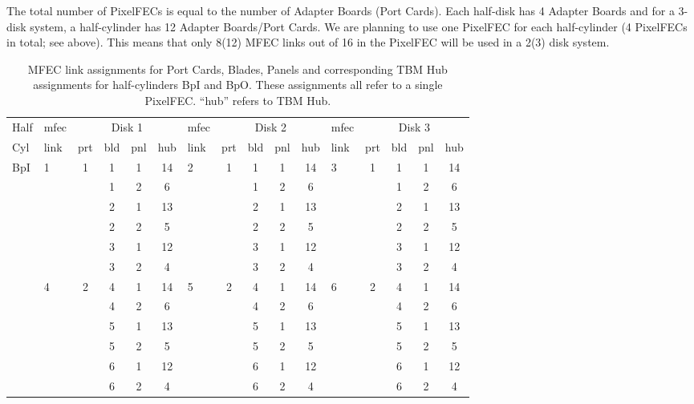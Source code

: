 \documentclass{cmspaper}
\begin{document}
The total number of PixelFECs is equal to the number of Adapter Boards (Port
Cards). Each half-disk has 4 Adapter Boards and for a 3-disk system,
a half-cylinder has 12 Adapter Boards/Port Cards. We are planning to
use one PixelFEC for each half-cylinder (4 PixelFECs in total; see above).
This means that only 8(12) MFEC links out of 16 in the PixelFEC will be used
in a 2(3) disk system.


\begin{table}[htb]
    \caption{MFEC link assignments for Port Cards, Blades, Panels and 
corresponding TBM Hub assignments for half-cylinders BpI and BpO. 
These assignments
all refer to a single PixelFEC. ``hub'' refers to TBM Hub.}
    \label{table:pixelFEC_Bp}
    \begin{center}
      \begin{tabular}{l|l|cccc|l|cccc|l|cccc} \hline
Half & mfec &  \multicolumn{4}{|c|}{Disk 1} & mfec  & 
\multicolumn{4}{|c}{Disk 2}  &   
mfec  & \multicolumn{4}{|c|}{Disk 3} \\ 
Cyl     & link & prt & bld & pnl & hub & link & prt & bld & pnl & hub &
link & prt & bld & pnl & hub \\  \hline
BpI & 1 & 1 & 1 & 1 & 14 & 2  & 1 & 1 & 1& 14 & 3 & 1 & 1 & 1& 14 \\ \hline
    &   &   & 1 & 2 & 6  &    &   & 1 & 2&  6 &   &   & 1 & 2&  6 \\ \hline
    &   &   & 2 & 1 & 13 &    &   & 2 & 1& 13 &   &   & 2 & 1& 13 \\ \hline
    &   &   & 2 & 2 & 5  &    &   & 2 & 2& 5  &   &   & 2 & 2& 5 \\ \hline
    &   &   & 3 & 1 & 12 &    &   & 3 & 1& 12 &   &   & 3 & 1& 12 \\ \hline
    &   &   & 3 & 2 & 4  &    &   & 3 & 2& 4  &   &   & 3 & 2& 4 \\ \hline
    & 4 & 2 & 4 & 1 & 14 & 5  & 2 & 4 & 1& 14 & 6 & 2 & 4 & 1& 14 \\ \hline
    &   &   & 4 & 2 &  6 &    &   & 4 & 2&  6 &   &   & 4 & 2& 6 \\ \hline
    &   &   & 5 & 1 & 13 &    &   & 5 & 1& 13 &   &   & 5 & 1& 13 \\ \hline
    &   &   & 5 & 2 &  5 &    &   & 5 & 2&  5 &   &   & 5 & 2&  5 \\ \hline
    &   &   & 6 & 1 & 12 &    &   & 6 & 1& 12 &   &   & 6 & 1& 12 \\ \hline
    &   &   & 6 & 2 &  4 &    &   & 6 & 2&  4 &   &   & 6 & 2&  4 \\ \hline

\end{tabular}
\end{center}
\end{table}
\end{document}
